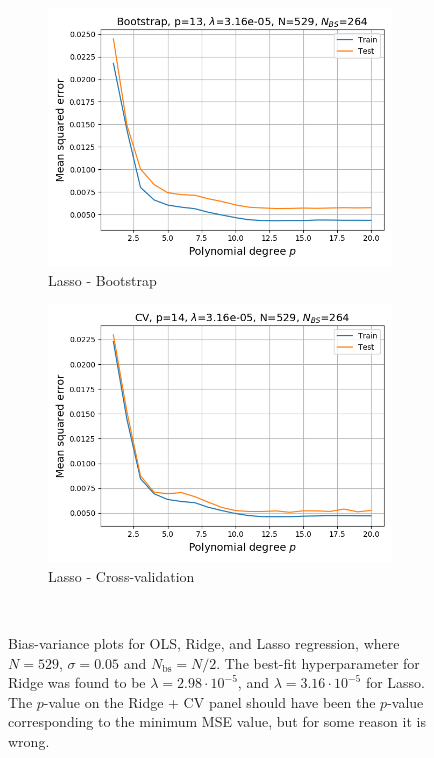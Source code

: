 \documentclass[a4paper]{article}
\begin{document}
\begin{figure}[H]
\begin{subfigure}{0.49\textwidth}
    \includegraphics[scale=0.45]{../figures/task_e/MSE_train_test_Bootstrap_N529_pmax20_nlamb15_noise0.05_seed4155_Lasso_boot_Nbs264_opt1.png}
    \caption{Lasso - Bootstrap}
  \end{subfigure}
  \begin{subfigure}{0.49\textwidth}
    \includegraphics[scale=0.45]{../figures/task_e/MSE_train_test_CV_N529_pmax20_nlamb15_noise0.05_seed4155_Lasso_cv_k5_opt1.png}
    \caption{Lasso - Cross-validation}
  \end{subfigure}\\  
  \caption{Bias-variance plots for OLS, Ridge, and Lasso regression, where $N=529$, $\sigma = 0.05$ and $N_{\text{bs}} = N/2$. The best-fit hyperparameter for Ridge was found to be $\lambda = 2.98\cdot10^{-5}$, and $\lambda = 3.16\cdot10^{-5}$ for Lasso. The $p$-value on the Ridge + CV panel should have been the $p$-value corresponding to the minimum MSE value, but for some reason it is wrong.}
  \label{fig:train_test_franke}
\end{figure}
\end{document}
